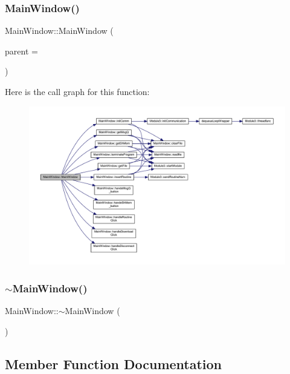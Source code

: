 \subsubsection{\texorpdfstring{Main\+Window()}{MainWindow()}}
{\footnotesize\ttfamily Main\+Window\+::\+Main\+Window (\begin{DoxyParamCaption}\item[{Q\+Widget $\ast$}]{parent = {} }\end{DoxyParamCaption})\hspace{0.3cm}{\ttfamily [explicit]}}

Here is the call graph for this function\+:
\nopagebreak
\begin{figure}[H]
\begin{center}
\leavevmode
\includegraphics[width=350pt]{class_main_window_a8b244be8b7b7db1b08de2a2acb9409db_cgraph}
\end{center}
\end{figure}
\mbox{\label{class_main_window_ae98d00a93bc118200eeef9f9bba1dba7}} 
\subsubsection{\texorpdfstring{$\sim$\+Main\+Window()}{~MainWindow()}}
{\footnotesize\ttfamily Main\+Window\+::$\sim$\+Main\+Window (\begin{DoxyParamCaption}{ }\end{DoxyParamCaption})}



\subsection{Member Function Documentation}
\mbox{\label{class_main_window_abc60bc84ec0badc555d692af286f8053}} 
